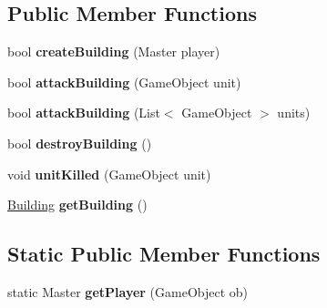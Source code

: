 \subsection*{Public Member Functions}
\begin{DoxyCompactItemize}
\item 
\hypertarget{class_asteroid_controller_adbba795cc94547b904b76ee5538dd59f}{}bool {\bfseries create\+Building} (Master player)\label{class_asteroid_controller_adbba795cc94547b904b76ee5538dd59f}

\item 
\hypertarget{class_asteroid_controller_ab363019e3e8cea23f88d00f0414dcbf7}{}bool {\bfseries attack\+Building} (Game\+Object unit)\label{class_asteroid_controller_ab363019e3e8cea23f88d00f0414dcbf7}

\item 
\hypertarget{class_asteroid_controller_afe37fe0c1d100561f22df54af83aa730}{}bool {\bfseries attack\+Building} (List$<$ Game\+Object $>$ units)\label{class_asteroid_controller_afe37fe0c1d100561f22df54af83aa730}

\item 
\hypertarget{class_asteroid_controller_ac398b7ee353b74a40fba38a9438ba2bb}{}bool {\bfseries destroy\+Building} ()\label{class_asteroid_controller_ac398b7ee353b74a40fba38a9438ba2bb}

\item 
\hypertarget{class_asteroid_controller_a1cda3a360b1b402d2cfb020379e70ccf}{}void {\bfseries unit\+Killed} (Game\+Object unit)\label{class_asteroid_controller_a1cda3a360b1b402d2cfb020379e70ccf}

\item 
\hypertarget{class_asteroid_controller_a3d51e1ac2d51dc0c8e55186d0042336f}{}\hyperlink{class_asteroid_controller_1_1_building}{Building} {\bfseries get\+Building} ()\label{class_asteroid_controller_a3d51e1ac2d51dc0c8e55186d0042336f}

\end{DoxyCompactItemize}
\subsection*{Static Public Member Functions}
\begin{DoxyCompactItemize}
\item 
\hypertarget{class_asteroid_controller_acc4302a7a420e00f85397ab0f89b5215}{}static Master {\bfseries get\+Player} (Game\+Object ob)\label{class_asteroid_controller_acc4302a7a420e00f85397ab0f89b5215}

\end{DoxyCompactItemize}
